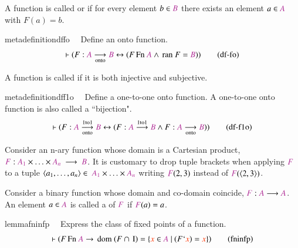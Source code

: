 A function is called  or 
 if for every element $b\in \mc{B}$ there exists an element $a\in \mc{A}$ with $F(a)=b$.  

\begin{restatable}{metadefinition}{dffo}~~ Define an onto function.  
\begin{align}
\vdash ( F : \mc{A} \underset{\mathrm{onto}}{\longrightarrow} \mc{B}
    \leftrightarrow ( F \,\mathrm{Fn}~ \mc{A} \wedge \,\mathrm{ran}~ F = \mc{B} )
    )\label{eq:df-fo}\tag{df-fo}
\end{align}
\end{restatable}

A function is called  if it is both injective and subjective.

\begin{restatable}{metadefinition}{dff1o}~~ Define a one-to-one onto function.    A one-to-one onto function is also called a ``bijection".      ~
\begin{align}
\vdash ( F : \mc{A}
    \overset{\mathrm{1to1}}{\underset{\mathrm{onto}}{\longrightarrow}} \mc{B}
    \leftrightarrow ( F : \mc{A} \overset{\mathrm{1to1}}{\longrightarrow} \mc{B}
    \wedge F : \mc{A} \underset{\mathrm{onto}}{\longrightarrow} \mc{B} )
    )\label{eq:df-f1o}\tag{df-f1o}
\end{align}
\end{restatable}

\pn Consider an n-ary function whose domain is a Cartesian product, $\mc{F}:\mc{A_1} \times\ldots\times \mc{A_n}~\longrightarrow~\mc{B}$.  It is customary to drop tuple brackets when applying $\mc{F}$ to a tuple 
\(\langle a_1,\ldots,a_n\rangle\in~\mc{A_1} \times\ldots\times \mc{A_n}\) 
writing $\mc{F}(2,3)$ instead of $\mc{F}(\langle 2,3\rangle)$.

\pn Consider a binary function whose domain and co-domain coincide, $\mc{F}:\mc{A}\longrightarrow \mc{A}$.  An element
$a\in \mc{A}$ is called a  of $\mc{F}$ if $\mc{F}(a)=a$.

\begin{restatable}{lemma}{fninfp}~~ Express the class of fixed points of a
function.  ~
\begin{align}
\vdash ( F \,\mathrm{Fn}~ \mc{A} \rightarrow \,\mathrm{dom}~ ( F \cap
    \,\mathrm{I} ) = \{ \msc{x} \in \mc{A}~\vert~( F ` \msc{x} ) = \msc{x} \}
    )\label{eq:fninfp}\tag{fninfp}
\end{align}
\end{restatable}

